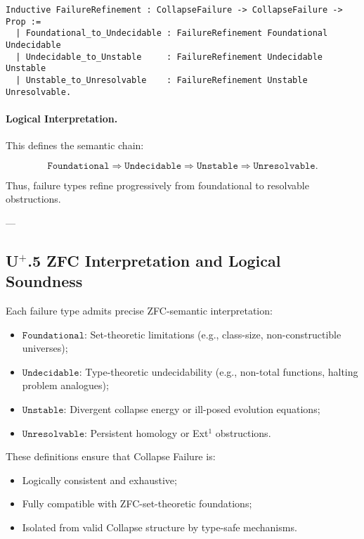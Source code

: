 \documentclass[11pt]{article}
\begin{document}
\begin{lstlisting}[language=Coq]
Inductive FailureRefinement : CollapseFailure -> CollapseFailure -> Prop :=
  | Foundational_to_Undecidable : FailureRefinement Foundational Undecidable
  | Undecidable_to_Unstable     : FailureRefinement Undecidable Unstable
  | Unstable_to_Unresolvable    : FailureRefinement Unstable Unresolvable.
\end{lstlisting}

\paragraph{Logical Interpretation.} This defines the semantic chain:

\[
\texttt{Foundational} \Rightarrow \texttt{Undecidable} \Rightarrow \texttt{Unstable} \Rightarrow \texttt{Unresolvable}.
\]

Thus, failure types refine progressively from foundational to resolvable obstructions.

---

\subsection*{U$^{+}$.5 ZFC Interpretation and Logical Soundness}

Each failure type admits precise ZFC-semantic interpretation:

\begin{itemize}
    \item $\texttt{Foundational}$: Set-theoretic limitations (e.g., class-size, non-constructible universes);
    \item $\texttt{Undecidable}$: Type-theoretic undecidability (e.g., non-total functions, halting problem analogues);
    \item $\texttt{Unstable}$: Divergent collapse energy or ill-posed evolution equations;
    \item $\texttt{Unresolvable}$: Persistent homology or Ext$^1$ obstructions.
\end{itemize}

These definitions ensure that Collapse Failure is:

\begin{itemize}
    \item Logically consistent and exhaustive;
    \item Fully compatible with ZFC-set-theoretic foundations;
    \item Isolated from valid Collapse structure by type-safe mechanisms.
\end{itemize}
\end{document}
